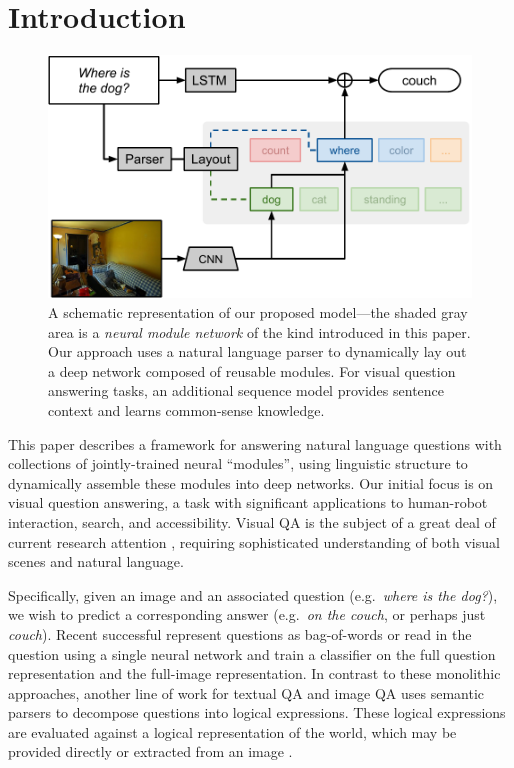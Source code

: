 \section{Introduction} 

\begin{figure}[t] \begin{center}
    \includegraphics[width=\linewidth]{fig/teaser} \end{center} \caption{
      A schematic representation of our proposed model---the shaded gray area is a
      {\it neural module network} of the kind introduced in this paper. Our
      approach uses a natural language parser to dynamically lay out a deep
      network composed of reusable modules. For visual question answering tasks,
      an additional sequence model provides sentence context and learns
      common-sense knowledge.
    } \label{fig:teaser}
\end{figure}

This paper describes a framework for answering natural language questions with
collections of jointly-trained neural ``modules'', using linguistic structure to
dynamically assemble these modules into deep networks. Our initial focus is on
visual question answering, a task with significant applications to human-robot
interaction, search, and accessibility. Visual QA is the subject of a great deal
of current research attention 
\cite{antol15iccv,gao2015you,ma15arxiv,malinowski15iccv,ren2015image,yu15arxiv}, 
requiring sophisticated understanding of both visual scenes and natural
language.

Specifically, given an image and an associated question (e.g.\ \emph{where is
the dog?}), we wish to predict a corresponding answer (e.g.\ \emph{on the couch},
or perhaps just \emph{couch}). Recent successful represent questions as
bag-of-words \cite{} or read in the question using a single neural network
\cite{malinowski15iccv}\cite{} and train a classifier on the full question
representation and the full-image representation. In contrast to these
monolithic approaches, another line of work for textual QA \cite{Liang13DCS} and
image QA \cite{malinowski14nips} uses semantic parsers to decompose questions
into logical expressions. These logical expressions are evaluated against a
logical representation of the world, which may be provided directly or extracted
from an image \cite{Krish2013Grounded}.

